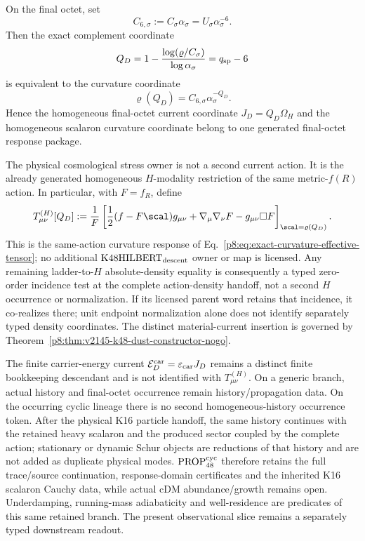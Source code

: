 \documentclass[12pt,a4paper]{article}
\begin{document}
\begin{theorem}
\label{p8:thm:v292-k48-h-modality-corealization}
On the final octet, set
\[
 C_{6,\sigma}:=C_\sigma\alpha_\sigma
 =U_\sigma\alpha_\sigma^{-6}.
\]
Then the exact complement coordinate
\[
 Q_D
 =1-\frac{\log(\varrho/C_\sigma)}{\log\alpha_\sigma}
 =q_{\rm sp}-6
\]
is equivalent to the curvature coordinate
\[
 \boxed{\varrho(Q_D)=C_{6,\sigma}\alpha_\sigma^{-Q_D}}.
\]
Hence the homogeneous final-octet current coordinate
$J_D=Q_D\Omega_H$ and the homogeneous scalaron curvature coordinate belong to
one generated final-octet response package.

The physical cosmological stress owner is not a second current action.  It is
the already generated homogeneous $H$-modality restriction of the same
metric-$f(R)$ action.  In particular, with $F=f_R$, define
\[
 T^{(H)}_{\mu\nu}[Q_D]
 :=\frac1F\left[
 \frac12(f-F\scal)g_{\mu\nu}
 +\nabla_\mu\nabla_\nu F
 -g_{\mu\nu}\Box F\right]_{\scal=\varrho(Q_D)}.
\]
This is the same-action curvature response of
Eq.~\eqref{p8:eq:exact-curvature-effective-tensor}; no additional
$\mathrm{K48HILBERT}_{\rm descent}$ owner or map is licensed.
Any remaining ladder-to-\(H\) absolute-density equality is consequently a
typed zero-order incidence test at the complete action-density handoff, not a
second \(H\) occurrence or normalization.  If its licensed parent word
retains that incidence, it co-realizes there; unit endpoint normalization
alone does not identify separately typed density coordinates.  The distinct
material-current insertion is governed by
Theorem~\ref{p8:thm:v2145-k48-dust-constructor-nogo}.

The finite carrier-energy current
$\mathcal E_D^{\rm car}=\varepsilon_{\rm car}J_D$ remains a distinct finite
bookkeeping descendant and is not identified with $T^{(H)}_{\mu\nu}$.
On a generic branch, actual history and final-octet occurrence remain
history/propagation data.  On the occurring cyclic lineage there is no second
homogeneous-history occurrence token.  After the physical K16 particle handoff,
the same history continues with the retained heavy scalaron and the produced
sector coupled by the complete action; stationary or dynamic Schur objects are
reductions of that history and are not added as duplicate physical modes.
\(\mathrm{PROP}^{\rm cyc}_{48}\) therefore retains the full trace/source
continuation, response-domain certificates and the inherited K16 scalaron
Cauchy data, while actual cDM abundance/growth remains open.  Underdamping,
running-mass adiabaticity and well-residence are predicates of this same retained
branch.  The present observational slice remains a separately typed downstream
readout.
\end{theorem}
\end{document}
